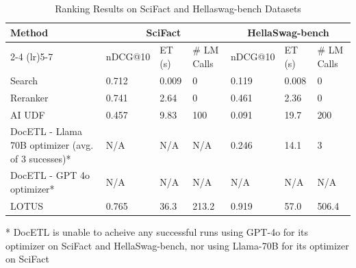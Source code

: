 \begin{footnotesize}
    
    
\begin{table}[t]

\centering
\caption{\small Ranking Results on SciFact and Hellaswag-bench Datasets}
\vspace{-.3cm}
\begin{threeparttable}
\begin{tabular}{p{2.2cm}p{1cm}p{.6cm}p{.5cm}p{1cm}p{.6cm}p{.5cm}}
\toprule    
\multirow{2}{*}{Method} & \multicolumn{3}{c}{SciFact} & \multicolumn{3}{c}{HellaSwag-bench} \\
\cmidrule(lr){2-4} \cmidrule(lr){5-7}
& nDCG@10  & ET (s) & \# LM Calls & nDCG@10  & ET (s) & \# LM Calls\\
\midrule
Search &
0.712 & 0.009 & 0 & 
0.119 & 0.008 & 0\\

Reranker & 
0.741 & 2.64 & 0 &
0.461 & 2.36 & 0 \\

AI UDF &
0.457 & 9.83 & 100 &
0.091 & 19.7 & 200 \\

DocETL - Llama 70B optimizer (avg. of 3 sucesses)*&
N/A & N/A & N/A &
0.246 & 14.1 & 3 \\


DocETL - GPT 4o optimizer*&
N/A & N/A & N/A &
N/A & N/A & N/A \\







LOTUS &
0.765 & 36.3 & 213.2 &
0.919 & 57.0 & 506.4 \\


\bottomrule
\end{tabular}
\begin{tablenotes}
\centering
\footnotesize
\item[] * DocETL is unable to acheive any successful runs using GPT-4o for its optimizer on SciFact and HellaSwag-bench, nor using Llama-70B for its optimizer on SciFact
\end{tablenotes}
\vspace{-.3cm}
\end{threeparttable}
\label{tab:ranking_main}


\end{table}
\end{footnotesize}
